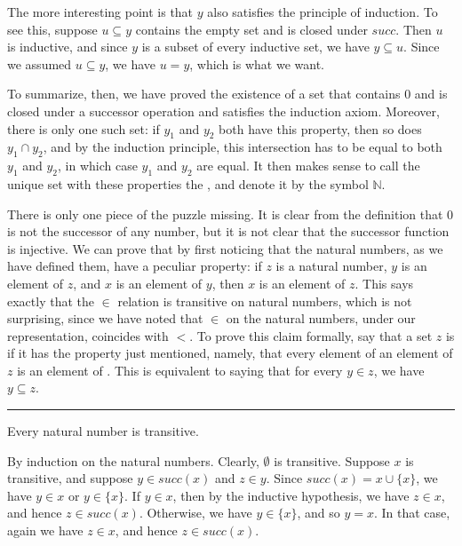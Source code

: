 \documentclass[letterpaper,10pt,english]{sphinxmanual}
\begin{document}
\sphinxAtStartPar
The more interesting point is that \(y\) also satisfies the principle of induction. To see this, suppose \(u \subseteq y\) contains the empty set and is closed under \(\mathit{succ}\). Then \(u\) is inductive, and since \(y\) is a subset of every inductive set, we have \(y \subseteq u\). Since we assumed \(u \subseteq y\), we have \(u = y\), which is what we want.

\sphinxAtStartPar
To summarize, then, we have proved the existence of a set that contains \(0\) and is closed under a successor operation and satisfies the induction axiom. Moreover, there is only one such set: if \(y_1\) and \(y_2\) both have this property, then so does \(y_1 \cap y_2\), and by the induction principle, this intersection has to be equal to both \(y_1\) and \(y_2\), in which case \(y_1\) and \(y_2\) are equal. It then makes sense to call the unique set with these properties the , and denote it by the symbol \(\mathbb{N}\).

\sphinxAtStartPar
There is only one piece of the puzzle missing. It is clear from the definition that \(0\) is not the successor of any number, but it is not clear that the successor function is injective. We can prove that by first noticing that the natural numbers, as we have defined them, have a peculiar property: if \(z\) is a natural number, \(y\) is an element of \(z\), and \(x\) is an element of \(y\), then \(x\) is an element of \(z\). This says exactly that the \(\in\) relation is transitive on natural numbers, which is not surprising, since we have noted that \(\in\) on the natural numbers, under our representation, coincides with \(<\). To prove this claim formally, say that a set \(z\) is  if it has the property just mentioned, namely, that every element of an element of \(z\) is an element of . This is equivalent to saying that for every \(y \in z\), we have \(y \subseteq z\).


\bigskip\hrule\bigskip


\sphinxAtStartPar
{} Every natural number is transitive.

\sphinxAtStartPar
{} By induction on the natural numbers. Clearly, \(\emptyset\) is transitive. Suppose \(x\) is transitive, and suppose \(y \in \mathit{succ}(x)\) and \(z \in y\). Since \(\mathit{succ}(x) = x \cup \{ x \}\), we have \(y \in x\) or \(y \in \{x\}\). If \(y \in x\), then by the inductive hypothesis, we have \(z \in x\), and hence \(z \in \mathit{succ}(x)\). Otherwise, we have \(y \in \{ x \}\), and so \(y = x\). In that case, again we have \(z \in x\), and hence \(z \in \mathit{succ}(x)\).
\end{document}
